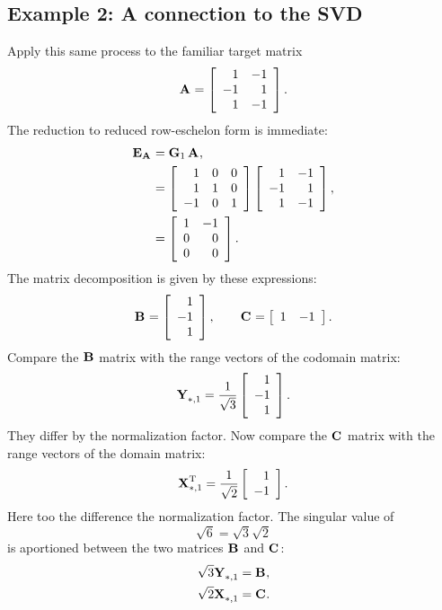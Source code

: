 \subsection{Example 2: A connection to the SVD}
Apply this same process to the familiar target matrix
\begin{equation}
  \A{} = \Aexample.
\end{equation}
The reduction to reduced row-eschelon form is immediate:
\begin{equation}
\begin{split}
  \E{\A{}} &= \G{1}\,\A{},\\
   & =
\mat{rrr}{1&0&0 \\ 1&1&0 \\ -1&0&1}
\Aexample, \\
   &= 
\mat{rr}{1&-1 \\ 0&0 \\ 0&0}.
\end{split}
\end{equation}
The matrix decomposition is given by these expressions:
\begin{equation}
    \B{} = \mat{r}{1 \\ -1 \\ 1}, \qquad \C{} = \mat{rr}{1&-1}.\\
\end{equation}
Compare the $\B{}$ matrix with the range vectors of the codomain matrix:
\begin{equation}
  \Y{}_{*,1} = \sthree \mat{r}{1 \\ -1 \\ 1}.
\end{equation}
They differ by the normalization factor. Now compare the $\C{}$ matrix with the range vectors of the domain matrix:
\begin{equation}
  \X{T}_{*,1} = \stwo \mat{r}{1 \\ -1}.
\end{equation}
Here too the difference the normalization factor. The singular value of 
$$
\sqrt{6} = \sqrt{3}\sqrt{2}
$$
is aportioned between the two matrices $\B{}$ and $\C{}$:
\begin{equation}
  \begin{split}
    \sqrt{3} \Y{}_{*,1} & = \B{},\\
    \sqrt{2} \X{}_{*,1} & = \C{}.
  \end{split}
\end{equation}



\endinput